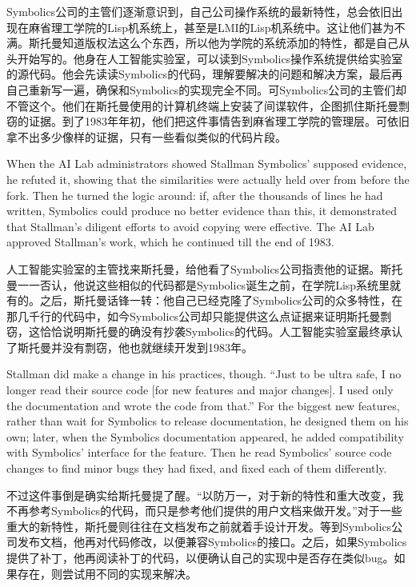 \ifdefined\chs
Symbolics公司的主管们逐渐意识到，自己公司操作系统的最新特性，总会依旧出现在麻省理工学院的Lisp机系统上，甚至是LMI的Lisp机系统中。这让他们甚为不满。斯托曼知道版权法这么个东西，所以他为学院的系统添加的特性，都是自己从头开始写的。他身在人工智能实验室，可以读到Symbolics操作系统提供给实验室的源代码。他会先读读Symbolics的代码，理解要解决的问题和解决方案，最后再自己重新写一遍，确保和Symbolics的实现完全不同。可Symbolics公司的主管们却不管这个。他们在斯托曼使用的计算机终端上安装了间谍软件，企图抓住斯托曼剽窃的证据。到了1983年年初，他们把这件事情告到麻省理工学院的管理层。可依旧拿不出多少像样的证据，只有一些看似类似的代码片段。
\fi

\ifdefined\eng
When the AI Lab administrators showed Stallman Symbolics' supposed evidence, he refuted it, showing that the similarities were actually held over from before the fork.  Then he turned the logic around: if, after the thousands of lines he had written, Symbolics could produce no better evidence than this, it demonstrated that Stallman's diligent efforts to avoid copying were effective.  The AI Lab approved Stallman's work, which he continued till the end of 1983.
\fi

\ifdefined\chs
人工智能实验室的主管找来斯托曼，给他看了Symbolics公司指责他的证据。斯托曼一一否认，他说这些相似的代码都是Symbolics诞生之前，在学院Lisp系统里就有的。之后，斯托曼话锋一转：他自己已经克隆了Symbolics公司的众多特性，在那几千行的代码中，如今Symbolics公司却只能提供这么点证据来证明斯托曼剽窃，这恰恰说明斯托曼的确没有抄袭Symbolics的代码。人工智能实验室最终承认了斯托曼并没有剽窃，他也就继续开发到1983年。
\fi

\ifdefined\eng
Stallman did make a change in his practices, though.  ``Just to be ultra safe, I no longer read their source code [for new features and major changes]. I used only the documentation and wrote the code from that.''  For the biggest new features, rather than wait for Symbolics to release documentation, he designed them on his own; later, when the Symbolics documentation appeared, he added compatibility with Symbolics' interface for the feature.  Then he read Symbolics' source code changes to find minor bugs they had fixed, and fixed each of them differently.
\fi

\ifdefined\chs
不过这件事倒是确实给斯托曼提了醒。``以防万一，对于新的特性和重大改变，我不再参考Symbolics的代码，而只是参考他们提供的用户文档来做开发。''对于一些重大的新特性，斯托曼则往往在文档发布之前就着手设计开发。等到Symbolics公司发布文档，他再对代码修改，以便兼容Symbolics的接口。之后，如果Symbolics提供了补丁，他再阅读补丁的代码，以便确认自己的实现中是否存在类似bug。如果存在，则尝试用不同的实现来解决。
\fi

